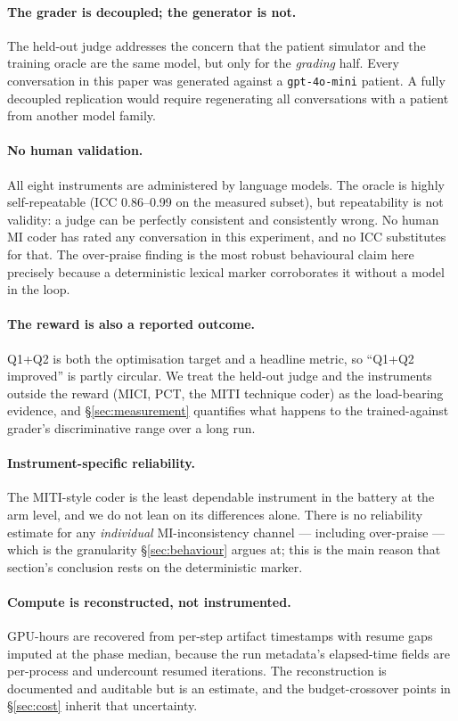 \paragraph{The grader is decoupled; the generator is not.}
The held-out judge addresses the concern that the patient simulator and the training oracle are the
same model, but only for the \emph{grading} half. Every conversation in this paper was generated
against a \texttt{gpt-4o-mini} patient. A fully decoupled replication would require regenerating
all conversations with a patient from another model family.

\paragraph{No human validation.}
All eight instruments are administered by language models. The oracle is highly self-repeatable
(ICC 0.86--0.99 on the measured subset), but repeatability is not validity: a judge can be
perfectly consistent and consistently wrong. No human MI coder has rated any conversation in this
experiment, and no ICC substitutes for that. The over-praise finding is the most robust behavioural
claim here precisely because a deterministic lexical marker corroborates it without a model in the
loop.

\paragraph{The reward is also a reported outcome.}
Q1+Q2 is both the optimisation target and a headline metric, so ``Q1+Q2 improved'' is partly
circular. We treat the held-out judge and the instruments outside the reward (MICI, PCT, the MITI
technique coder) as the load-bearing evidence, and \S\ref{sec:measurement} quantifies what happens
to the trained-against grader's discriminative range over a long run.

\paragraph{Instrument-specific reliability.}
The MITI-style coder is the least dependable instrument in the battery at the arm level, and we do
not lean on its differences alone. There is no reliability estimate for any \emph{individual}
MI-inconsistency channel --- including over-praise --- which is the granularity
\S\ref{sec:behaviour} argues at; this is the main reason that section's conclusion rests on the
deterministic marker.

\paragraph{Compute is reconstructed, not instrumented.}
GPU-hours are recovered from per-step artifact timestamps with resume gaps imputed at the phase
median, because the run metadata's elapsed-time fields are per-process and undercount resumed
iterations. The reconstruction is documented and auditable but is an estimate, and the
budget-crossover points in \S\ref{sec:cost} inherit that uncertainty.
